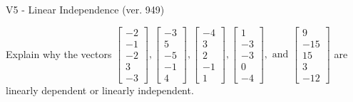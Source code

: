 \begin{exercise}
  \begin{exerciseTitle}V5 - Linear Independence (ver. 949)\end{exerciseTitle}
  \begin{exerciseStatement}
    Explain why the vectors \(\left[\begin{array}{r}
-2 \\
-1 \\
-2 \\
3 \\
-3
\end{array}\right] , \left[\begin{array}{r}
-3 \\
5 \\
-5 \\
-1 \\
4
\end{array}\right] , \left[\begin{array}{r}
-4 \\
3 \\
2 \\
-1 \\
1
\end{array}\right] , \left[\begin{array}{r}
1 \\
-3 \\
-3 \\
0 \\
-4
\end{array}\right] , \text{ and } \left[\begin{array}{r}
9 \\
-15 \\
15 \\
3 \\
-12
\end{array}\right]\) are linearly dependent or linearly independent.	



\end{exerciseStatement}
\end{exercise}
